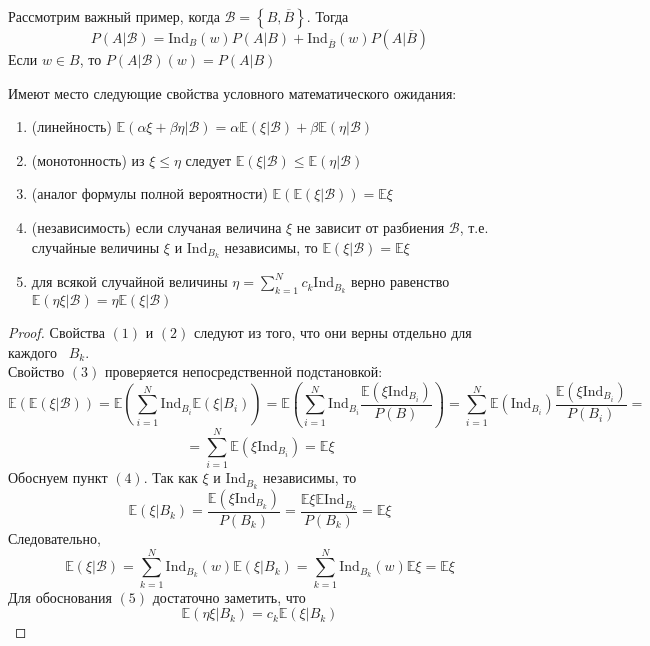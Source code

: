\begin{example}
Рассмотрим важный пример, когда $\mathcal{B} = \left\{ B, \overline{B}\right\}$. Тогда 
\[
    P\left(A | \mathcal{B}\right) = \text{Ind}_{B}\left(w\right) P\left(A | B\right) + \text{Ind}_{\overline{B}}\left(w\right) P\left(A | \overline{B}\right)
\]
Если $w \in B$, то $P\left(A | \mathcal{B}\right)\left(w\right) = P\left(A | B\right)$
\end{example}

\begin{theorem}
Имеют место следующие свойства условного математического ожидания:
\begin{enumerate}[label=(\arabic*)]
\item (линейность) $\mathbb{E}\left(\alpha \xi + \beta \eta | \mathcal{B}\right) = \alpha \mathbb{E}\left(\xi | \mathcal{B}\right) + \beta \mathbb{E}\left(\eta | \mathcal{B}\right)$
\item (монотонность) из $\xi \leq \eta$ следует $\mathbb{E}\left(\xi | \mathcal{B}\right) \leq \mathbb{E}\left(\eta | \mathcal{B}\right)$
\item (аналог формулы полной вероятности) $\mathbb{E}\left(\mathbb{E}\left(\xi | \mathcal{B}\right)\right) = \mathbb{E}\xi$
\item (независимость) если случаная величина $\xi$ не зависит от разбиения $\mathcal{B}$, т.е. случайные величины $\xi$ и $\text{Ind}_{B_k}$ независимы, то $\mathbb{E}\left(\xi | \mathcal{B}\right) = \mathbb{E} \xi$
\item для всякой случайной величины $\eta = \sum_{k = 1}^{N} c_k \text{Ind}_{B_k}$ верно равенство
$\mathbb{E}\left(\eta \xi | \mathcal{B}\right) = \eta \mathbb{E}\left(\xi | \mathcal{B}\right)$

\end{enumerate}
\end{theorem}
\begin{proof}
Свойства $(1)$ и $(2)$ следуют из того, что они верны отдельно для каждого  $B_k$. \\ 
Свойство $(3)$ проверяется непосредственной подстановкой: 
\[
    \mathbb{E}\left(\mathbb{E}\left(\xi | \mathcal{B}\right)\right) = \mathbb{E} \left(\sum_{i = 1}^{N} \text{Ind}_{B_{i}} \mathbb{E}\left(\xi | B_i\right)\right)
    = \mathbb{E} \left(\sum_{i = 1}^{N} \text{Ind}_{B_{i}} \frac{\mathbb{E}\left(\xi \text{Ind}_{B_i}\right)}{P\left(B\right)}\right) = \sum_{i = 1}^{N} \mathbb{E}\left(\text{Ind}_{B_i}\right) \frac{\mathbb{E}\left(\xi \text{Ind}_{B_i}\right)}{P\left(B_i\right)} = \]
    \[
    =\sum_{i = 1}^{N} \mathbb{E}\left(\xi \text{Ind}_{B_i}\right) = \mathbb{E} \xi
\]
Обоснуем пункт $(4)$. Так как $\xi$ и $\text{Ind}_{B_k}$ независимы, то 
\[
    \mathbb{E}\left(\xi | B_k\right) = \frac{\mathbb{E}\left(\xi \text{Ind}_{B_k}\right)}{P\left(B_k\right)} = \frac{\mathbb{E}\xi \mathbb{E} \text{Ind}_{B_k}}{P\left(B_k\right)} = \mathbb{E}\xi
\]
Следовательно,
\[
    \mathbb{E}\left(\xi | \mathcal{B}\right) = \sum_{k = 1}^{N} \text{Ind}_{B_k}\left(w\right) \mathbb{E} \left(\xi | B_k\right) = \sum_{k = 1}^{N} \text{Ind}_{B_k}\left(w\right) \mathbb{E} \xi = \mathbb{E} \xi
\]
Для обоснования $(5)$ достаточно заметить, что
\[
    \mathbb{E}\left(\eta \xi | B_k\right) = c_k \mathbb{E}\left(\xi | B_k\right)
\]
\end{proof}

